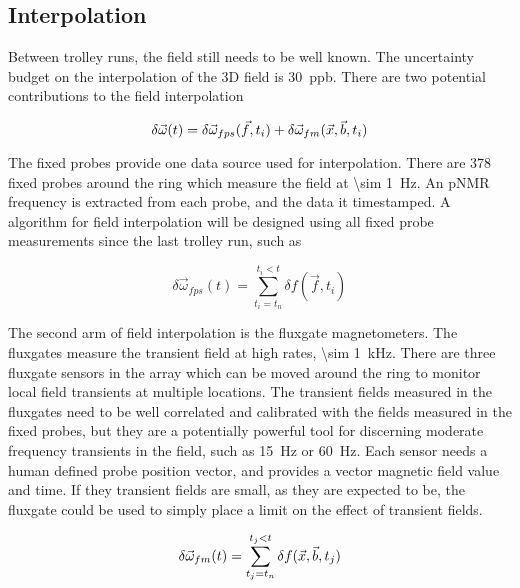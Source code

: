 
\subsection{Interpolation}

Between trolley runs, the field still needs to be well known.  The uncertainty budget on the interpolation of the 3D field is \SI{30}{ppb}.  There are two potential contributions to the field interpolation

\begin{equation}
\label{eqn:field-interpolation}
\delta \vec{\omega}(t) = \delta \vec{\omega}_{fps}(\vec{f}, t_i) \\
+ \delta \vec{\omega}_{fm}(\vec{x}, \vec{b}, t_i)
\end{equation}

The fixed probes provide one data source used for interpolation.  There are 378 fixed probes around the ring which measure the field at \SI{\sim 1}{\Hz}.  An pNMR frequency is extracted from each probe, and the data it timestamped.  A algorithm for field interpolation will be designed using all fixed probe measurements since the last trolley run, such as

\begin{equation}
\label{eqn:field-interpolation-fps}
\delta \vec{\omega}_{fps}(t) = \sum_{t_i = t_n}^{t_i < t} \delta f(\vec{f}, t_i)
\end{equation}

The second arm of field interpolation is the fluxgate magnetometers.  The fluxgates measure the transient field at high rates, \SI{\sim 1}{\kHz}.  There are three fluxgate sensors in the array which can be moved around the ring to monitor local field transients at multiple locations.  The transient fields measured in the fluxgates need to be well correlated and calibrated with the fields measured in the fixed probes, but they are a potentially powerful tool for discerning moderate frequency transients in the field, such as \SI{15}{\Hz} or \SI{60}{\Hz}.  Each sensor needs a human defined probe position vector, and provides a vector magnetic field value and time.  If they transient fields are small, as they are expected to be, the fluxgate could be used to simply place a limit on the effect of transient fields.

\begin{equation}
\label{eqn:field-interpolation-fm}
\delta \vec{\omega}_{fm}(t) \\
= \sum_{t_j = t_n}^{t_j < t} \delta f(\vec{x}, \vec{b}, t_j)
\end{equation}

